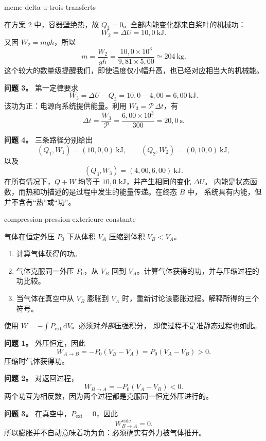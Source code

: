 \begin{exo}{meme-delta-u-trois-transferts}
\begin{solution}
在方案 2 中，容器壁绝热，故 $Q_2=0$。全部内能变化都来自桨叶的机械功：
\[
W_2=\Delta U=10{,}0\ \mathrm{kJ}.
\]
又因 $W_2=mgh$，所以
\[
m=\frac{W_2}{gh}
=\frac{10{,}0\times10^3}{9{,}81\times5{,}00}
\simeq 204\ \mathrm{kg}.
\]
这个较大的数量级提醒我们，即使温度仅小幅升高，也已经对应相当大的机械能。

\textbf{问题 3。} 第一定律要求
\[
W_3=\Delta U-Q_3=10{,}0-4{,}00=6{,}00\ \mathrm{kJ}.
\]
该功为正：电源向系统提供能量。利用 $W_3=\mathcal P\,\Delta t$，有
\[
\Delta t=\frac{W_3}{\mathcal P}
=\frac{6{,}00\times10^3}{300}
=20{,}0\ \mathrm{s}.
\]

\textbf{问题 4。} 三条路径分别给出
\[
(Q_1,W_1)=(10{,}0,0)\ \mathrm{kJ},
\qquad
(Q_2,W_2)=(0,10{,}0)\ \mathrm{kJ},
\]
以及
\[
(Q_3,W_3)=(4{,}00,6{,}00)\ \mathrm{kJ}.
\]
在所有情况下，$Q+W$ 均等于 $10{,}0$ kJ，并产生相同的变化 $\Delta U$。
内能是状态函数，而热和功描述的是过程中发生的能量传递。在终态 $B$ 中，
系统具有内能，但并不含有“热”或“功”。
\end{solution}
\end{exo}

\begin{exo}[恒定外压下的压缩]{compression-pression-exterieure-constante}

气体在恒定外压 $P_0$ 下从体积 $V_A$ 压缩到体积 $V_B<V_A$。

\begin{enumerate}
\item 计算气体获得的功。
\item 气体克服同一外压 $P_0$，从 $V_B$ 回到 $V_A$。计算气体获得的功，并与压缩过程的功比较。
\item 当气体在真空中从 $V_B$ 膨胀到 $V_A$ 时，重新讨论该膨胀过程。解释所得的三个符号。
\end{enumerate}

\begin{indication}
使用 $W=-\int P_{\mathrm{ext}}\,\mathrm{d}V$。必须对\emph{外部}压强积分，
即使过程不是准静态过程也如此。
\end{indication}

\begin{solution}
\textbf{问题 1。} 外压恒定，因此
\[
W_{A\to B}=-P_0(V_B-V_A)=P_0(V_A-V_B)>0.
\]
压缩时气体获得功。

\textbf{问题 2。} 对返回过程，
\[
W_{B\to A}=-P_0(V_A-V_B)<0.
\]
两个功互为相反数，因为两个过程都是克服同一恒定外压进行的。

\textbf{问题 3。} 在真空中，$P_{\mathrm{ext}}=0$，因此
\[
W_{B\to A}^{\mathrm{vide}}=0.
\]
所以膨胀并不自动意味着功为负：必须确实有外力被气体推开。
\end{solution}
\end{exo}
